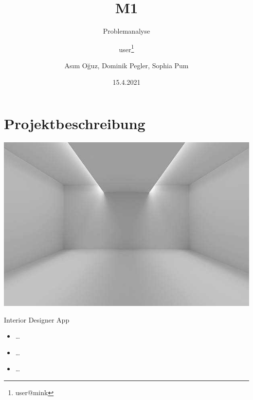 \documentclass[presentation,bigger,aspectratio=169]{beamer}
\author{user\thanks{user@mink}}
\date{15.4.2021}
\title{M1}
\subtitle{Problemanalyse}
\author[A.Oğuz, D.Pegler, S.Pum]{Asım Oğuz, Dominik Pegler, Sophia Pum}
\institute{Universität Wien, Fakultät für Informatik (SS2021)}
\begin{document}
\maketitle

\section{Projektbeschreibung}
\label{sec:org66547ea}
\begin{frame}[label={sec:orgd46cf19}]{\MakeUppercase{\insertsection}}
\begin{center}
\begin{center}
\includegraphics[height=0.77\textheight]{./img/m1_praes_empty_01.jpg}
\label{fig:m1_praes_empty_01}
\end{center}
\end{center}
\end{frame}
\begin{frame}[label={sec:orgc7c83b3}]{Interior Designer App}
\begin{itemize}
\item \ldots{}
\item \ldots{}
\item \ldots{}
\end{itemize}
\end{frame}
\end{document}
